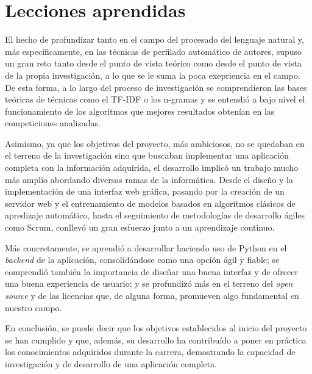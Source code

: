 {\section{Lecciones aprendidas}
\label{sec:lecciones_aprendidas}

El hecho de profundizar tanto en el campo del procesado del lenguaje natural y, más específicamente,
en las técnicas de perfilado automático de autores, supuso un gran reto tanto desde el punto de vista teórico como
desde el punto de vista de la propia investigación, a lo que se le suma la poca exepriencia en el campo. De esta forma, a lo largo del
proceso de investigación se comprendieron las bases teóricas de técnicas como el TF-IDF o los n-gramas y se entendió a
bajo nivel el funcionamiento de los algoritmos que mejores resultados obtenían en las competiciones analizadas.

\bigskip
Asimismo, ya que los objetivos del proyecto, más ambiciosos, no se quedaban en el terreno de la investigación
sino que buscaban implementar una aplicación completa con la información adquirida, el desarrollo implicó un trabajo
mucho más amplio abordando diversas ramas de la informática. Desde el diseño y la implementación de una interfaz web gráfica,
pasando por la creación de un servidor web y el entrenamiento de modelos basados en algoritmos clásicos
de apredizaje automático, hasta el seguimiento de metodologías de desarrollo ágiles como Scrum, conllevó
un gran esfuerzo junto a un aprendizaje continuo.

\bigskip
Más concretamente, se aprendió a desarrollar haciendo uso de Python en el \textit{backend} de la aplicación, consolidándose
como una opción ágil y fiable; se comprendió también la importancia de diseñar una buena interfaz
y de ofrecer una buena experiencia de usuario; y se profundizó más en el terreno del \textit{open source} y de las licencias
que, de alguna forma, promueven algo fundamental en nuestro campo.

\bigskip
En conclusión, se puede decir que los objetivos establecidos al inicio del proyecto se han cumplido y que,
además, su desarrollo ha contribuído a poner en práctica los conocimientos adquiridos durante la carrera,
demostrando la capacidad de investigación y de desarrollo de una aplicación completa.
}